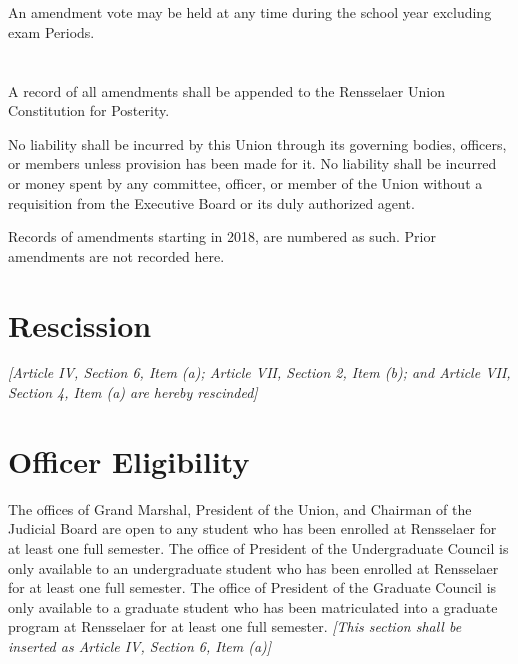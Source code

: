 \documentclass{uniondoc}
\begin{document}
\section{}

An amendment vote may be held at any time during the school year excluding exam Periods.

\section{}

A record of all amendments shall be appended to the Rensselaer Union Constitution for Posterity.


No liability shall be incurred by this Union through its governing bodies, officers, or members unless provision has been made for it. No liability shall be incurred or money spent by any committee, officer, or member of the Union without a requisition from the Executive Board or its duly authorized agent.

\amendments{}

\begin{center}
	Records of amendments starting in 2018, are numbered as such. Prior amendments are not recorded here.
\end{center}


\section{Rescission}
\textit{[Article IV, Section 6, Item (a); Article VII, Section 2, Item (b); and Article VII, Section 4, Item (a) are hereby rescinded]}

\section{Officer Eligibility}
The offices of Grand Marshal, President of the Union, and Chairman of the Judicial Board are open to any student who has been enrolled at Rensselaer for at least one full semester. The office of President of the Undergraduate Council is only available to an undergraduate student who has been enrolled at Rensselaer for at least one full semester. The office of President of the Graduate Council is only available to a graduate student who has been matriculated into a graduate program at Rensselaer for at least one full semester.
\textit{[This section shall be inserted as Article IV, Section 6, Item (a)]}
\end{document}
